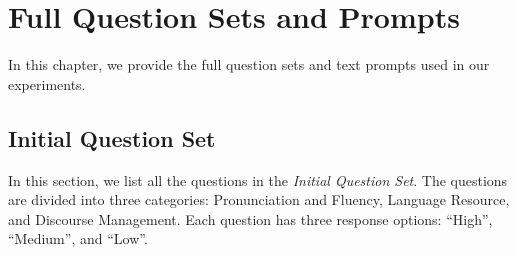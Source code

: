 \documentclass{report}
\begin{document}
\appendix




\chapter{Full Question Sets and Prompts}
\label{app:full_question_sets}
In this chapter, we provide the full question sets and text prompts used in our experiments.

\section{Initial Question Set}
\label{app_sec:initial_question_set}
In this section, we list all the questions in the \emph{Initial Question Set}. The questions are divided into three categories: Pronunciation and Fluency, Language Resource, and Discourse Management. Each question has three response options: ``High'', ``Medium'', and ``Low''.

\end{document}
